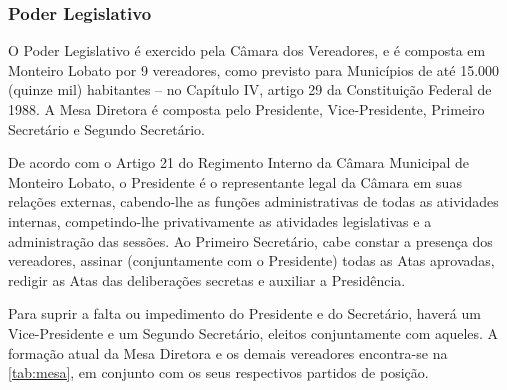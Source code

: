 \subsubsection{Poder Legislativo}
O Poder Legislativo é exercido pela Câmara dos Vereadores, e é composta em Monteiro Lobato por 9 vereadores, como previsto para Municípios de até 15.000 (quinze mil) habitantes – no Capítulo IV, artigo 29 da Constituição Federal de 1988. A Mesa Diretora é composta pelo Presidente, Vice-Presidente, Primeiro Secretário e Segundo Secretário.

De acordo com o Artigo 21 do Regimento Interno da Câmara Municipal de Monteiro Lobato, o Presidente é o representante legal da Câmara em suas relações externas, cabendo-lhe as funções administrativas de todas as atividades internas, competindo-lhe privativamente as atividades legislativas e a administração das sessões. Ao Primeiro Secretário, cabe constar a presença dos vereadores, assinar (conjuntamente com o Presidente) todas as Atas aprovadas, redigir as Atas das deliberações secretas e auxiliar a Presidência.

Para suprir a falta ou impedimento do Presidente e do Secretário, haverá um Vice-Presidente e um Segundo Secretário, eleitos conjuntamente com aqueles. A formação atual da Mesa Diretora e os demais vereadores encontra-se na \autoref{tab:mesa}, em conjunto com os seus respectivos partidos de posição.

%	

